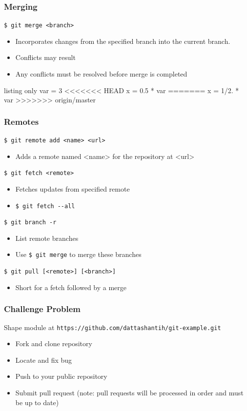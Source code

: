 \documentclass[english,compress]{beamer}
\begin{document}
\begin{frame}[fragile]
    \frametitle{Merging}

    \verb|$ git merge <branch>|
    \begin{itemize}
        \item Incorporates changes from the specified branch into the current
            branch.
        \item Conflicts may result
        \item Any conflicts must be resolved before merge is completed
    \end{itemize}

    \begin{tcblisting}{listing only}
var = 3
<<<<<<< HEAD
x = 0.5 * var
=======
x = 1/2. * var
>>>>>>> origin/master
    \end{tcblisting}
\end{frame}

\begin{frame}[fragile]
    \frametitle{Remotes}

    \verb|$ git remote add <name> <url>|
    \begin{itemize}
        \item Adds a remote named <name> for the repository at <url>
    \end{itemize}

    \verb|$ git fetch <remote>|
    \begin{itemize}
        \item Fetches updates from specified remote
        \item \verb|$ git fetch --all|
    \end{itemize}

    \verb|$ git branch -r |
    \begin{itemize}
        \item List remote branches
        \item Use \verb|$ git merge| to merge these branches
    \end{itemize}

    \verb|$ git pull [<remote>] [<branch>]|
    \begin{itemize}
        \item Short for a fetch followed by a merge
    \end{itemize}
\end{frame}

\begin{frame}[fragile]
    \frametitle{Challenge Problem}

    Shape module at \verb|https://github.com/dattashantih/git-example.git|
    \begin{itemize}
        \item Fork and clone repository
        \item Locate and fix bug
        \item Push to your public repository
        \item Submit pull request (note: pull requests will be processed in 
            order and must be up to date)
    \end{itemize}
\end{frame}
\end{document}
